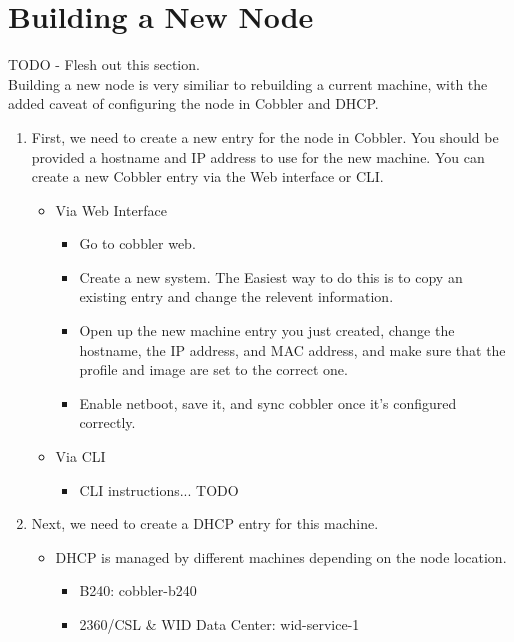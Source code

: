 \documentclass[10pt,letterpaper]{article}
\begin{document}
\section{Building a New Node}
    TODO - Flesh out this section. \\

    Building a new node is very similiar to rebuilding a current machine, with the
    added caveat of configuring the node in Cobbler and DHCP.
    \begin{enumerate}
        \item First, we need to create a new entry for the node in Cobbler. You
        should be provided a hostname and IP address to use for the new machine.
        You can create a new Cobbler entry via the Web interface or CLI.
        \begin{itemize}
            \item Via Web Interface
            \begin{itemize}
                \item Go to cobbler web.
                \item Create a new system. The Easiest way to do this is to copy
                an existing entry and change the relevent information.
                \item Open up the new machine entry you just created, change the
                hostname, the IP address, and MAC address, and make sure that
                the profile and image are set to the correct one.
                \item Enable netboot, save it, and sync cobbler once it's configured
                correctly.
            \end{itemize}
            \item Via CLI
            \begin{itemize}
                \item CLI instructions... TODO
            \end{itemize}
        \end{itemize}
        \item Next, we need to create a DHCP entry for this machine.
        \begin{itemize}
            \item DHCP is managed by different machines depending on the node location.
            \begin{itemize}
                \item B240: cobbler-b240
                \item 2360/CSL \& WID Data Center: wid-service-1

\end{itemize}
\end{itemize}
\end{enumerate}
\end{document}
